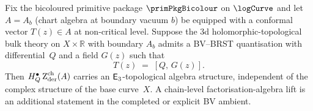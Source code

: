 \begin{construction}
\label{constr:topologization}
Fix the bicoloured primitive package $\primPkgBicolour$ on $\logCurve$
and let $A = A_b$ (chart algebra at boundary vacuum $b$) be equipped
with a conformal vector $T(z) \in A$ at non-critical level. Suppose
the $3$d holomorphic-topological bulk theory on $X \times \mathbb{R}$
with boundary $A_b$ admits a BV--BRST quantisation with differential~$Q$
and a field $G(z)$ such that
\begin{equation}\label{eq:sugawara-Q-exact}
T(z) \;=\; [Q,\, G(z)].
\end{equation}
Then $H_Q^\bullet\operatorname{Z}_{\mathrm{der}}^{\mathrm{ch}}(A)$ carries an
$\mathsf{E}_3$-topological algebra structure, independent of the
complex structure of the base curve~$X$. A chain-level
factorisation-algebra lift is an additional statement in the
completed or explicit BV ambient.
\end{construction}

